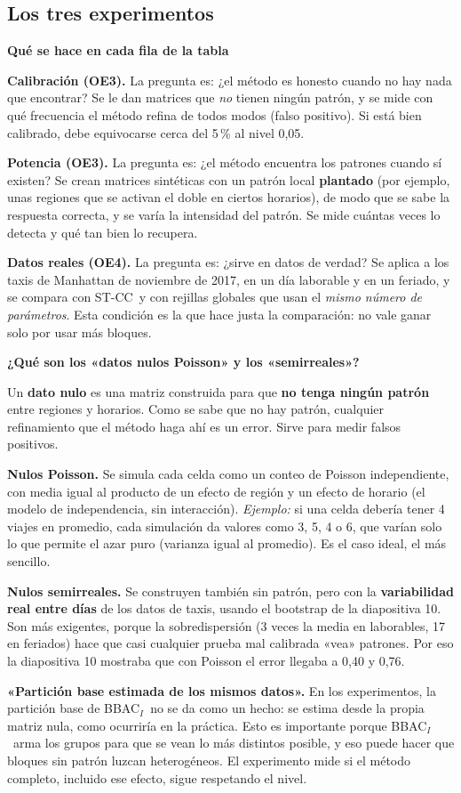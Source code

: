 \documentclass[11pt,a4paper]{article}
\newcommand{\cajainicio}[3]{\par\medskip\noindent
  \begin{lrbox}{\cajabox}\begin{minipage}{\dimexpr\linewidth-2\fboxsep-2\fboxrule\relax}%
  \textbf{\color{#1}#3}\par\smallskip}
\newcommand{\cajafin}[2]{\end{minipage}\end{lrbox}\fcolorbox{#1}{#2}{\usebox{\cajabox}}\par\medskip}
\newenvironment{nota}[1]{\cajainicio{acc}{acc!7}{#1}}{\cajafin{acc}{acc!7}}
\newcommand{\STCC}{ST-CC}
\newcommand{\BBAC}{BBAC$_I$}
\begin{document}
\subsection*{Los tres experimentos}

\begin{nota}{Qué se hace en cada fila de la tabla}
\textbf{Calibración (OE3).} La pregunta es: ¿el método es honesto cuando no hay nada que encontrar? Se le dan matrices que \emph{no} tienen ningún patrón, y se mide con qué frecuencia el método refina de todos modos (falso positivo). Si está bien calibrado, debe equivocarse cerca del 5\,\% al nivel 0,05.

\textbf{Potencia (OE3).} La pregunta es: ¿el método encuentra los patrones cuando sí existen? Se crean matrices sintéticas con un patrón local \textbf{plantado} (por ejemplo, unas regiones que se activan el doble en ciertos horarios), de modo que se sabe la respuesta correcta, y se varía la intensidad del patrón. Se mide cuántas veces lo detecta y qué tan bien lo recupera.

\textbf{Datos reales (OE4).} La pregunta es: ¿sirve en datos de verdad? Se aplica a los taxis de Manhattan de noviembre de 2017, en un día laborable y en un feriado, y se compara con \STCC\ y con rejillas globales que usan el \emph{mismo número de parámetros}. Esta condición es la que hace justa la comparación: no vale ganar solo por usar más bloques.
\end{nota}

\begin{nota}{¿Qué son los «datos nulos Poisson» y los «semirreales»?}
Un \textbf{dato nulo} es una matriz construida para que \textbf{no tenga ningún patrón} entre regiones y horarios. Como se sabe que no hay patrón, cualquier refinamiento que el método haga ahí es un error. Sirve para medir falsos positivos.

\textbf{Nulos Poisson.} Se simula cada celda como un conteo de Poisson independiente, con media igual al producto de un efecto de región y un efecto de horario (el modelo de independencia, sin interacción). \textit{Ejemplo:} si una celda debería tener 4 viajes en promedio, cada simulación da valores como 3, 5, 4 o 6, que varían solo lo que permite el azar puro (varianza igual al promedio). Es el caso ideal, el más sencillo.

\textbf{Nulos semirreales.} Se construyen también sin patrón, pero con la \textbf{variabilidad real entre días} de los datos de taxis, usando el bootstrap de la diapositiva 10. Son más exigentes, porque la sobredispersión (3 veces la media en laborables, 17 en feriados) hace que casi cualquier prueba mal calibrada «vea» patrones. Por eso la diapositiva 10 mostraba que con Poisson el error llegaba a 0,40 y 0,76.

\textbf{«Partición base estimada de los mismos datos».} En los experimentos, la partición base de \BBAC\ no se da como un hecho: se estima desde la propia matriz nula, como ocurriría en la práctica. Esto es importante porque \BBAC\ arma los grupos para que se vean lo más distintos posible, y eso puede hacer que bloques sin patrón luzcan heterogéneos. El experimento mide si el método completo, incluido ese efecto, sigue respetando el nivel.
\end{nota}
\end{document}

